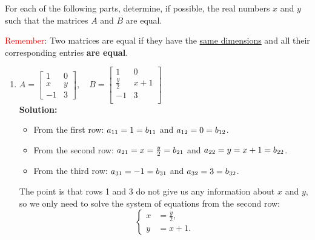 \item For each of the following parts, determine, if possible, the real numbers $x$ and $y$ such that the matrices $A$ and $B$ are equal.

    \textcolor{red}{Remember}: Two matrices are equal if they have the \underline{same dimensions} and all their corresponding entries \textbf{are equal}.

    \begin{enumerate}
        \item
            $A = \begin{bmatrix}
                1 & 0 \\
                x & y \\
                -1 & 3
            \end{bmatrix}, \quad
            B = \begin{bmatrix}
                1 & 0 \\    
                \frac{y}{2} & x + 1 \\    
                -1 & 3 \\    
            \end{bmatrix}$ \\[1.5em]
    
    \textbf{Solution:}
    \begin{banswer}
        \begin{itemize}
            \item From the first row: $\mathlarger{a}_{11} = 1 = \mathlarger{b}_{11}$ and $\mathlarger{a}_{12} = 0 = \mathlarger{b}_{12}$.
            \item From the second row: $\mathlarger{a}_{21} = x = \frac{y}{2} = \mathlarger{b}_{21}$ and $\mathlarger{a}_{22} = y = x + 1 = \mathlarger{b}_{22}$.
            \item From the third row: $\mathlarger{a}_{31} = -1 = \mathlarger{b}_{31}$ and $\mathlarger{a}_{32} = 3 = \mathlarger{b}_{32}$.
        \end{itemize}

        The point is that rows 1 and 3 do not give us any information about $x$ and $y$, so we only need to solve the system of equations from the second row:
        $$
        \left\{
        \begin{aligned}
            x &= \frac{y}{2},\\
            y &= x+1.
        \end{aligned}
        \right.
        $$


\end{banswer}
\end{enumerate}
